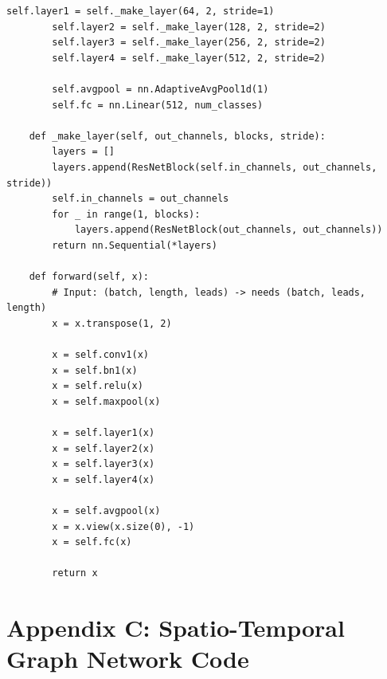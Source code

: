 \documentclass[12pt,a4paper]{report}
\begin{document}
\begin{lstlisting}[caption={1D adapted ResNet-18 Architecture (src/models/cnn.py)}]
        self.layer1 = self._make_layer(64, 2, stride=1)
        self.layer2 = self._make_layer(128, 2, stride=2)
        self.layer3 = self._make_layer(256, 2, stride=2)
        self.layer4 = self._make_layer(512, 2, stride=2)
        
        self.avgpool = nn.AdaptiveAvgPool1d(1)
        self.fc = nn.Linear(512, num_classes)
        
    def _make_layer(self, out_channels, blocks, stride):
        layers = []
        layers.append(ResNetBlock(self.in_channels, out_channels, stride))
        self.in_channels = out_channels
        for _ in range(1, blocks):
            layers.append(ResNetBlock(out_channels, out_channels))
        return nn.Sequential(*layers)
        
    def forward(self, x):
        # Input: (batch, length, leads) -> needs (batch, leads, length)
        x = x.transpose(1, 2)
        
        x = self.conv1(x)
        x = self.bn1(x)
        x = self.relu(x)
        x = self.maxpool(x)
        
        x = self.layer1(x)
        x = self.layer2(x)
        x = self.layer3(x)
        x = self.layer4(x)
        
        x = self.avgpool(x)
        x = x.view(x.size(0), -1)
        x = self.fc(x)
        
        return x
\end{lstlisting}

\clearpage

\chapter*{Appendix C: Spatio-Temporal Graph Network Code}
\label{app:gnn}
\end{document}
